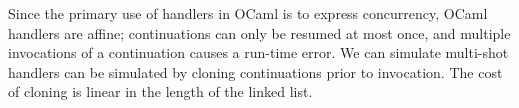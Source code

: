 \documentclass[12pt,mscres,cdtppar,twoside,openright,logo,rightchapter,normalheadings]{infthesis}
\theoremstyle{definition}
\begin{document}
Since the primary use of handlers in OCaml is to express concurrency,
OCaml handlers are affine; continuations can only be resumed at most
once, and multiple invocations of a continuation causes a run-time
error. We can simulate multi-shot handlers can be simulated by cloning
continuations prior to invocation. The cost of cloning is linear in
the length of the linked list. 


\end{document}
